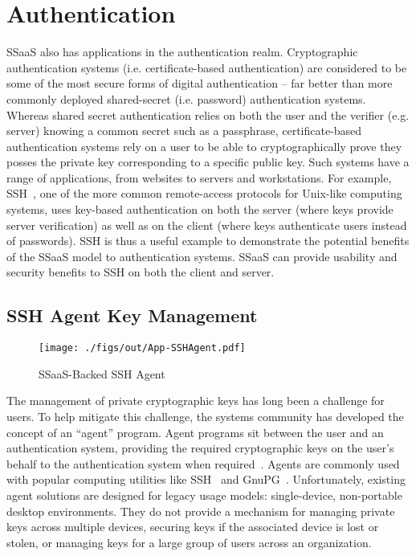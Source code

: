 \section{Authentication}

SSaaS also has applications in the authentication realm. Cryptographic
authentication systems (i.e. certificate-based authentication) are
considered to be some of the most secure forms of digital
authentication -- far better than more commonly deployed shared-secret
(i.e. password) authentication systems. Whereas shared secret
authentication relies on both the user and the verifier (e.g. server)
knowing a common secret such as a passphrase, certificate-based
authentication systems rely on a user to be able to cryptographically
prove they posses the private key corresponding to a specific public
key. Such systems have a range of applications, from websites to
servers and workstations. For example, SSH~\cite{ylonen1996}, one of
the more common remote-access protocols for Unix-like computing
systems, uses key-based authentication on both the server (where keys
provide server verification) as well as on the client (where keys
authenticate users instead of passwords). SSH is thus a useful example
to demonstrate the potential benefits of the SSaaS model to
authentication systems. SSaaS can provide usability and security
benefits to SSH on both the client and server.

\subsection{SSH Agent Key Management}

\begin{figure}[t]
  \centering
  \texttt{[image: ./figs/out/App-SSHAgent.pdf]}
  \caption{SSaaS-Backed SSH Agent}
  \label{fig:app-sshagent}
\end{figure}

The management of private cryptographic keys has long been a challenge
for users. To help mitigate this challenge, the systems community has
developed the concept of an ``agent'' program. Agent programs sit
between the user and an authentication system, providing the required
cryptographic keys on the user's behalf to the authentication system
when required~\cite{cox2002}. Agents are commonly used with popular
computing utilities like SSH~\cite{ylonen1996} and
GnuPG~\cite{gnupg}. Unfortunately, existing agent solutions are
designed for legacy usage models: single-device, non-portable desktop
environments. They do not provide a mechanism for managing private
keys across multiple devices, securing keys if the associated device
is lost or stolen, or managing keys for a large group of users across
an organization.

